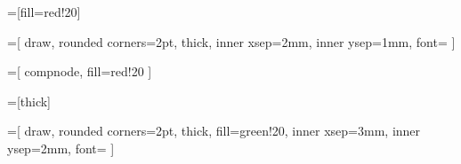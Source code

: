 
=[fill=red!20]

=[%
    draw,
    rounded corners=2pt,
    thick,
    inner xsep=2mm,
    inner ysep=1mm,
    font=\small
]

=[%
    compnode,
    fill=red!20
]

=[thick]

=[
    draw,
    rounded corners=2pt,
    thick,
    fill=green!20,
    inner xsep=3mm,
    inner ysep=2mm,
    font=\small
]

\newcommand{\FAResult}[2][]{%
    \node[resultbox,#1] at (7.8,-1.2) {#2};
}


\newcommand{\FAInput}[3]{%
    \node[font=\large] at (2.4,1.45) {$#1\textcolor{red}{#2}#3$};
}

\newcommand{\FAInputFinished}[1]{%
    \node[font=\large] at (2.4,1.45) {$#1\;\textcolor{red}{\lambda}$};
}


\newcommand{\CompNode}[4][]{%
    \node[compnode,#1] (#2) at #3 {$#4$};
}

\newcommand{\CompEdge}[4][]{%
    \draw[compedge,#1] (#2) -- node[midway,font=\scriptsize,fill=white,inner sep=1pt] {$#3$} (#4);
}

